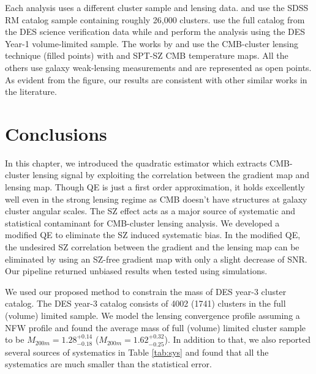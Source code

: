 {%
Each analysis uses a different cluster sample and lensing data.
\citet{simet18} and \citet{geach17} use the SDSS RM catalog sample containing roughly 26,000 clusters. %
\citet{melchoir17} use the full catalog from the DES science verification data while \cite{baxter18} and \cite{mcclintock18} perform the analysis using the DES Year-1 volume-limited sample.
The works by \citet{geach17} and \cite{baxter18} use the CMB-cluster lensing technique (filled points) with \planck{} and {\sc SPT-SZ} CMB temperature maps.
All the others use galaxy weak-lensing measurements and are represented as open points. As evident from the figure, our results are consistent with other similar works in the literature.
}\fi
\section{Conclusions}
\label{sec_con}

In this chapter, we introduced the quadratic estimator which extracts CMB-cluster lensing signal by exploiting the correlation between the gradient map and lensing map. 
Though QE is just a first order approximation, it holds excellently well even in the strong lensing regime as CMB doesn't have structures at galaxy cluster angular scales. 
The SZ effect acts as a major source of systematic and statistical contaminant for CMB-cluster lensing analysis.
We developed a modified QE to eliminate the SZ induced systematic bias. 
In the modified QE, the undesired SZ correlation between the gradient and the lensing map can be eliminated by using an SZ-free gradient map with only a slight decrease of SNR. 
Our pipeline returned unbiased results when tested using simulations. 
 
We used our proposed method to constrain the mass of DES year-3 cluster catalog.
The DES year-3 catalog consists of 4002 (1741) clusters in the full (volume) limited sample. 
We model the lensing convergence profile assuming a NFW profile and found the average mass of full (volume) limited cluster sample to be $M_{200m} = 1.28^{+0.14}_{-0.18}$ ($M_{200m} = 1.62^{+0.32}_{-0.25}$). 
In addition to that, we also reported several sources of systematics in Table \ref{tab:sys} and found that all the systematics are much smaller than the statistical error.%



  
 
